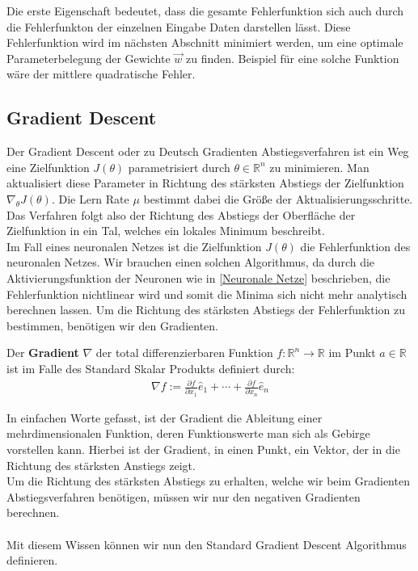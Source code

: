 Die erste Eigenschaft bedeutet, dass die gesamte Fehlerfunktion 
sich auch durch die Fehlerfunkton der einzelnen Eingabe Daten darstellen lässt.
Diese Fehlerfunktion wird im nächsten Abschnitt minimiert werden, um
eine optimale Parameterbelegung der Gewichte $\vec{w}$ zu finden. 
Beispiel für eine solche Funktion wäre der 
mittlere quadratische Fehler.

\subsection{Gradient Descent}\label{Gradient Descent}

Der Gradient Descent oder zu Deutsch Gradienten Abstiegsverfahren
ist ein Weg eine Zielfunktion $J(\theta)$ parametrisiert durch $\theta \in \mathbb{R}^n$
zu minimieren. Man aktualisiert diese Parameter in Richtung des stärksten Abstiegs
der Zielfunktion $\nabla_\theta J(\theta)$. Die Lern Rate $\mu$ bestimmt
dabei die Größe der Aktualisierungsschritte. Das Verfahren folgt 
also der Richtung des Abstiegs der Oberfläche der Zielfunktion in ein Tal,
welches ein lokales Minimum
beschreibt. \cite[Kapitel 1]{Ruder.9152016} \\

Im Fall eines neuronalen Netzes ist die Zielfunktion $J(\theta)$ die
Fehlerfunktion des neuronalen Netzes. 
Wir brauchen einen solchen Algorithmus, da durch die Aktivierungsfunktion der Neuronen
wie in \ref{Neuronale Netze} beschrieben, die Fehlerfunktion nichtlinear wird und somit
die Minima sich nicht mehr analytisch berechnen lassen.
Um die Richtung des stärksten Abstiegs der Fehlerfunktion zu bestimmen, benötigen
wir den Gradienten.


\begin{definition}
    \cite{Konigsberger.2002}
    Der \textbf{Gradient} $\nabla$ der total differenzierbaren Funktion
    $f:\mathbb{R}^n \rightarrow \mathbb{R}$ im Punkt $a\in\mathbb{R}$ ist im
    Falle des Standard Skalar Produkts definiert durch:
    \begin{align}
        \nabla f := \frac{\partial f}{\partial x_{1}}\hat{e}_{1}+\cdots+\frac{\partial f}{\partial x_{n}}\hat{e}_{n}
    \end{align}
\end{definition}

In einfachen Worte gefasst, ist der Gradient die Ableitung einer mehrdimensionalen
Funktion, deren Funktionswerte man sich als Gebirge vorstellen kann.
Hierbei ist der Gradient, in einen Punkt, ein Vektor, der in die Richtung des 
stärksten Anstiegs zeigt. \\
Um die Richtung des stärksten Abstiegs zu erhalten, welche wir beim Gradienten
Abstiegsverfahren benötigen, müssen wir nur den negativen Gradienten berechnen. \\\\
Mit diesem Wissen können wir nun den Standard Gradient Descent Algorithmus definieren.

